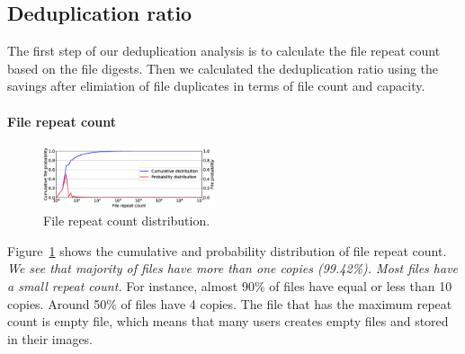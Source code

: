 \subsection{Deduplication ratio}
\label{sec:dedup_ratio}


The first step of our deduplication analysis is to calculate the file repeat count based on the file digests. Then we calculated the deduplication ratio using the savings after elimiation of file duplicates in terms of file count and capacity.

\paragraph{File repeat count}
\begin{figure}
	\centering
	\includegraphics[width=0.45\textwidth]{graphs/File_repeat_count.eps}
	\caption{File repeat count distribution.
	}
	\label{fig:file-repeat-cnt}
\end{figure}

Figure~\ref{fig:file-repeat-cnt} shows the cumulative and probability distribution of file repeat count.
\textit{We see that majority of files have more than one copies (99.42\%).
Most files have a small repeat count.} For instance, almost 90\% of files have equal or less than 10 copies. Around 50\% of files have 4 copies.
The file that has the maximum repeat count is empty file, which means that many users creates empty files and stored in their images.

